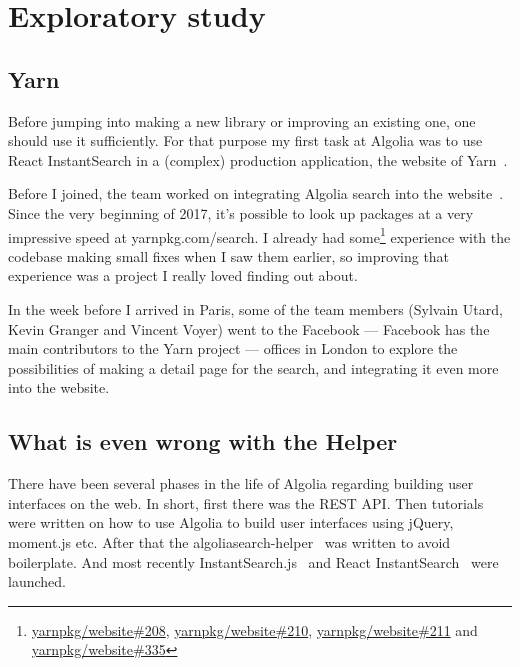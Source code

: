 
\chapter{Exploratory study} %
\section{Yarn} %
\label{chp:yarn}

Before jumping into making a new library or improving an existing one, one should use it sufficiently. For that purpose my first task at Algolia was to use React InstantSearch in a (complex) production application, the website of Yarn~\cite{yarn-site}.


Before I joined, the team worked on integrating Algolia search into the website~\cite{yarn-pr-add-algolia}. Since the very beginning of 2017, it's possible to look up packages at a very impressive speed at yarnpkg.com/search. I already had some\footnote{\href{https://github.com/yarnpkg/website/pulls/208}{yarnpkg/website\#208}, \href{https://github.com/yarnpkg/website/pulls/210}{yarnpkg/website\#210}, \href{https://github.com/yarnpkg/website/pulls211}{yarnpkg/website\#211} and \href{https://github.com/yarnpkg/website/pulls/335}{yarnpkg/website\#335}} experience with the codebase making small fixes when I saw them earlier, so improving that experience was a project I really loved finding out about.

In the week before I arrived in Paris, some of the team members (Sylvain Utard, Kevin Granger and Vincent Voyer) went to the Facebook --- Facebook has the main contributors to the Yarn project --- offices in London to explore the possibilities of making a detail page for the search, and integrating it even more into the website.

\section{What is even wrong with the Helper} %
\label{sec:what_is_even_wrong_with_the_helper}

There have been several phases in the life of Algolia regarding building user interfaces on the web. In short, first there was the REST API\@. Then tutorials were written on how to use Algolia to build user interfaces using jQuery, moment.js etc. After that the algoliasearch-helper~\cite{algolia-js-helper} was written to avoid boilerplate. And most recently InstantSearch.js~\cite{instantsearch-js} and React InstantSearch~\cite{react-instantsearch} were launched.

